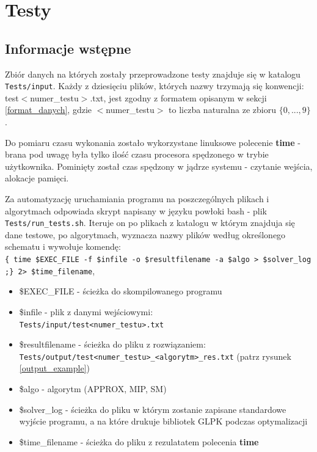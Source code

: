 \chapter{Testy}  
\thispagestyle{chapterBeginStyle}
\label{ch:CHAPTER_4}

\section{Informacje wstępne}
Zbiór danych na których zostały przeprowadzone testy znajduje się w katalogu \verb|Tests/input|. Każdy z dziesięciu plików, których nazwy trzymają się konwencji: test$<$numer\_testu$>$.txt, jest zgodny z formatem opisanym w sekcji \ref{format_danych}, gdzie $<$numer\_testu$>$ to liczba naturalna ze zbioru $\{0, ..., 9\}$.

Do pomiaru czasu wykonania zostało wykorzystane linuksowe polecenie \textbf{time} - brana pod uwagę była tylko ilość czasu procesora spędzonego w trybie użytkownika. Pominięty został czas spędzony w jądrze systemu - czytanie wejścia, alokacje pamięci.

Za automatyzację uruchamiania programu na poszczególnych plikach i algorytmach odpowiada skrypt napisany w języku powłoki bash - plik \verb|Tests/run_tests.sh|. Iteruje on po plikach z katalogu w którym znajduja się dane testowe, po algorytmach, wyznacza nazwy plików według określonego schematu i wywołuje komendę: \\
\verb|{ time $EXEC_FILE -f $infile -o $resultfilename -a $algo > $solver_log ;} 2> $time_filename|, 

\begin{itemize}
	\item \$EXEC\_FILE - ścieżka do skompilowanego programu
	\item \$infile - plik z danymi wejściowymi: \\
	\verb|Tests/input/test<numer_testu>.txt|
	\item \$resultfilename - ścieżka do pliku z rozwiązaniem: \\ \verb|Tests/output/test<numer_testu>_<algorytm>_res.txt| (patrz rysunek \ref{output_example})
	\item \$algo - algorytm (APPROX, MIP, SM)
	\item \$solver\_log - ścieżka do pliku w którym zostanie zapisane standardowe wyjście programu, a na które drukuje bibliotek GLPK podczas optymalizacji
	\item \$time\_filename - ścieżka do pliku z rezulatatem polecenia \textbf{time}
\end{itemize}

